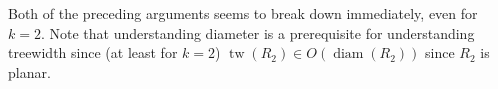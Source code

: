 \documentclass{patmorin}
\DeclareMathOperator{\diam}{diam}
\DeclareMathOperator{\tw}{tw}
\begin{document}
Both of the preceding arguments seems to break down immediately, even for $k=2$.  Note that understanding diameter is a prerequisite for understanding treewidth since (at least for $k=2$) $\tw(R_2) \in O(\diam(R_2))$ since $R_2$ is planar.














\end{document}
